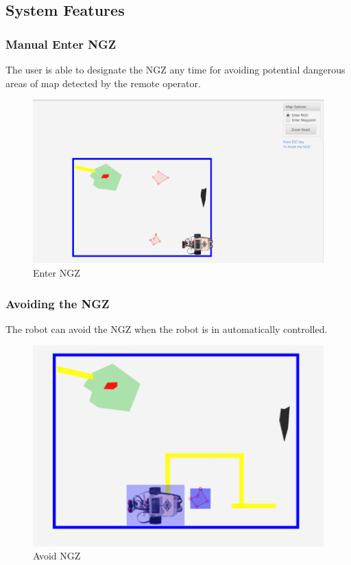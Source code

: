 \documentclass[10pt,a4paper,titlepage]{article}
\begin{document}
 
 
  \subsection{System Features} 
   
  \subsubsection{Manual Enter NGZ} 
  The user is able to designate the NGZ any time for avoiding potential dangerous areas of map detected by the remote operator. 
  \begin{figure}[H] 
  \includegraphics[width=\linewidth]{enterngz.png}  %
  \caption{Enter NGZ} 
  \label{fig:Enter NGZ}               
  \end{figure} 
 
  \subsubsection{Avoiding the NGZ} 
The robot can avoid the NGZ when the robot is in automatically controlled.  \begin{figure}[H] 
  \includegraphics[width=\linewidth]{avoidngz.png}  %
  \caption{Avoid NGZ} 
  \label{fig:Avoid NGZ}               
  \end{figure} 
   
\end{document}
